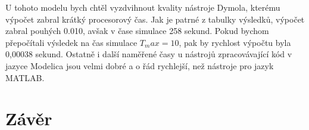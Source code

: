 U tohoto modelu bych chtěl vyzdvihnout kvality nástroje Dymola, kterému výpočet zabral krátký procesorový čas. Jak je patrné z tabulky výsledků, výpočet zabral pouhých 0.010, avšak v čase simulace 258 sekund. Pokud bychom přepočítali výsledek na čas simulace $T_max = 10$, pak by rychlost výpočtu byla 0,00038 sekund. Ostatně i další naměřené časy u nástrojů zpracovávající kód v jazyce Modelica jsou velmi dobré a o řád rychlejší, než nástroje pro jazyk MATLAB.





\chapter{Závěr}
\label{kapitola6}












